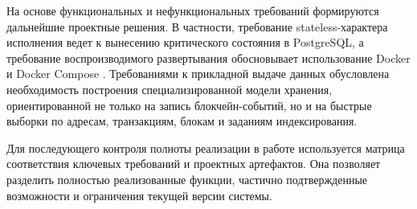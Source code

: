 На основе функциональных и нефункциональных требований формируются дальнейшие
проектные решения. В частности, требование stateless-характера исполнения ведет к
вынесению критического состояния в PostgreSQL, а требование воспроизводимого
развертывания обосновывает использование Docker и Docker Compose
\cite{docker_docs, compose_docs}. Требованиями к прикладной выдаче данных
обусловлена необходимость построения специализированной модели хранения,
ориентированной не только на запись блокчейн-событий, но и на быстрые выборки
по адресам, транзакциям, блокам и заданиям индексирования.

Для последующего контроля полноты реализации в работе используется матрица
соответствия ключевых требований и проектных артефактов. Она позволяет
разделить полностью реализованные функции, частично подтвержденные
возможности и ограничения текущей версии системы.

